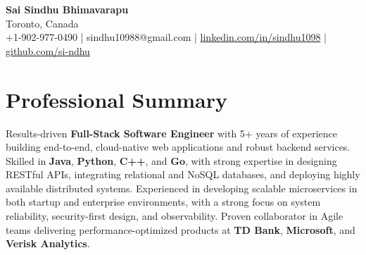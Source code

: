 \documentclass[letterpaper,11pt]{article}
\begin{document}
\begin{center}
  {\Large \textbf{Sai Sindhu Bhimavarapu}} \\
  Toronto, Canada \\
  +1-902-977-0490 \enspace | \enspace sindhu10988@gmail.com \enspace | \enspace \href{https://www.linkedin.com/in/sindhu1098/}{linkedin.com/in/sindhu1098} \enspace | \enspace \href{https://github.com/si-ndhu}{github.com/si-ndhu}
\end{center}

\section{Professional Summary}
  \begin{itemize}[leftmargin=0.15in, label={}]
    \small{\item{
     Results-driven \textbf{Full-Stack Software Engineer} with 5+ years of experience building end-to-end, cloud-native web applications and robust backend services. Skilled in \textbf{Java}, \textbf{Python}, \textbf{C++}, and \textbf{Go}, with strong expertise in designing RESTful APIs, integrating relational and NoSQL databases, and deploying highly available distributed systems. Experienced in developing scalable microservices in both startup and enterprise environments, with a strong focus on system reliability, security-first design, and observability. Proven collaborator in Agile teams delivering performance-optimized products at \textbf{TD Bank}, \textbf{Microsoft}, and \textbf{Verisk Analytics}.
    }}
  \end{itemize}
\vspace{-16pt}

\end{document}

